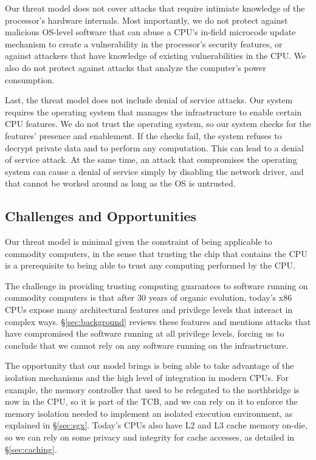 Our threat model does not cover attacks that require intimiate knowledge of the
processor's hardware internals. Most importantly, we do not protect against
malicious OS-level software that can abuse a CPU's in-field microcode update
mechanism to create a vulnerability in the processor's security features, or
against attackers that have knowledge of existing vulnerabilities in the CPU.
We also do not protect against attacks that analyze the computer's power
consumption.

Last, the threat model does not include denial of service attacks. Our system
requires the operating system that manages the infrastructure to enable certain
CPU features. We do not trust the operating system, so our system checks for
the features' presence and enablement. If the checks fail, the system refuses
to decrypt private data and to perform any computation. This can lead to a
denial of service attack. At the same time, an attack that compromises the
operating system can cause a denial of service simply by disabling the network
driver, and that cannot be worked around as long as the OS is untrusted.

\subsection{Challenges and Opportunities}

Our threat model is minimal given the constraint of being applicable to
commodity computers, in the sense that trusting the chip that contains the CPU
is a prerequisite to being able to trust any computing performed by the CPU.

The challenge in providing trusting computing guarantees to software running on
commodity computers is that after 30 years of organic evolution, today's x86
CPUs expose many architectural features and privilege levels that interact in
complex ways. \S \ref{sec:background} reviews these features and mentions
attacks that have compromised the software running at all privilege levels,
forcing us to conclude that we cannot rely on any software running on the
infrastructure.

The opportunity that our model brings is being able to take advantage of the
isolation mechanisms and the high level of integration in modern CPUs. For
example, the memory controller that used to be relegated to the northbridge is
now in the CPU, so it is part of the TCB, and we can rely on it to enforce the
memory isolation needed to implement an isolated execution environment, as
explained in \S \ref{sec:sgx}. Today's CPUs also have L2 and L3 cache memory
on-die, so we can rely on some privacy and integrity for cache accesses, as
detailed in \S \ref{sec:caching}.

